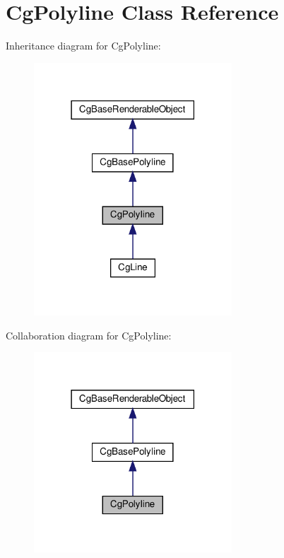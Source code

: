 \hypertarget{class_cg_polyline}{}\section{Cg\+Polyline Class Reference}
\label{class_cg_polyline}


Inheritance diagram for Cg\+Polyline\+:
\nopagebreak
\begin{figure}[H]
\begin{center}
\leavevmode
\includegraphics[width=210pt]{class_cg_polyline__inherit__graph}
\end{center}
\end{figure}


Collaboration diagram for Cg\+Polyline\+:
\nopagebreak
\begin{figure}[H]
\begin{center}
\leavevmode
\includegraphics[width=210pt]{class_cg_polyline__coll__graph}
\end{center}
\end{figure}
